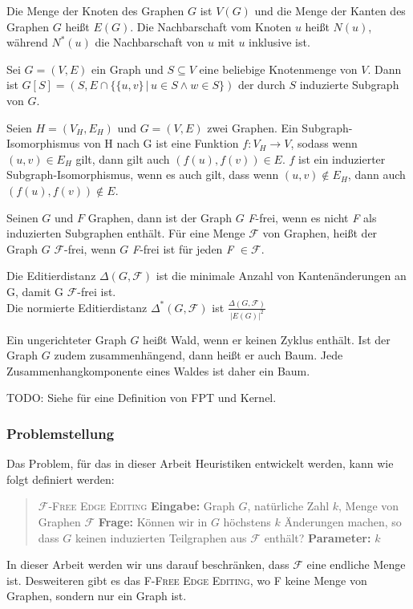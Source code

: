 \documentclass[12pt,a4paper,onecolumn,oneside,titlepage]{article}
\newcommand\cursive[1]{\ensuremath{\mathcal{#1}}}
\begin{document}
Die Menge der Knoten des Graphen $G$ ist $V(G)$ und die Menge der Kanten des Graphen $G$ heißt $E(G)$. Die Nachbarschaft vom Knoten $u$ heißt $N(u)$, während $N^{*}(u)$ die Nachbarschaft von $u$ mit $u$ inklusive ist.

Sei $G = (V,E)$ ein Graph und $S \subseteq V$ eine beliebige Knotenmenge von $V$. 
Dann ist $G[S] = (S, E \cap \{\{u,v\} \,|\, u \in S \land w \in S\})$ der durch $S$ induzierte Subgraph von $G$.

Seien $H = (V_H,E_H)$ und $G =(V,E)$ zwei Graphen. Ein Subgraph-Isomorphismus von H nach G ist eine Funktion $f : V_H \rightarrow V$, sodass wenn $(u,v) \in E_H $ gilt, dann gilt auch $(f(u),f(v)) \in E$. $f$ ist ein induzierter Subgraph-Isomorphismus, wenn es auch gilt, dass wenn $(u,v) \notin E_H$, dann auch $(f(u),f(v)) \notin E$.

Seinen $G$ und $F$ Graphen, dann ist der Graph $G$ \textit{F}-frei, wenn es nicht \textit{F} als induzierten Subgraphen enthält.
Für eine Menge \cursive{F} von Graphen, heißt der Graph $G$ \cursive{F}-frei, wenn $G$ \textit{F}-frei ist für jeden \textit{F} $\in \cursive{F}$.

Die Editierdistanz $\Delta(G, \cursive{F})$ ist die minimale Anzahl von Kantenänderungen an G, damit G \cursive{F}-frei ist.\\ Die normierte Editierdistanz $\Delta^{*}(G, \cursive{F})$ ist $\frac{\Delta(G, \cursive{F})}{|E(G)|^{2}}$

Ein ungerichteter Graph $G$ heißt Wald, wenn er keinen Zyklus enthält. Ist der Graph $G$ zudem zusammenhängend, dann heißt er auch Baum. Jede Zusammenhangkomponente eines Waldes ist daher ein Baum.

TODO: Siehe \cite{Cai96} für eine Definition von FPT und Kernel.
\subsubsection{Problemstellung}
\label{sec:problem}
Das Problem, für das in dieser Arbeit Heuristiken entwickelt werden, kann wie folgt definiert werden:
\begin{quote}
  \textsc{\cursive{F}-Free Edge Editing}\newline
  \textbf{Eingabe:} Graph $G$, natürliche Zahl $k$, Menge von Graphen \cursive{F}\newline
  \textbf{Frage:} Können wir in $G$ höchstens $k$ Änderungen machen, so dass $G$ keinen induzierten Teilgraphen aus \cursive{F} enthält?\newline
  \textbf{Parameter:} $k$
\end{quote}
In dieser Arbeit werden wir uns darauf beschränken, dass \cursive{F} eine endliche Menge ist.
Desweiteren gibt es das \textsc{F-Free Edge Editing}, wo \textsc{F} keine Menge von Graphen, sondern nur ein Graph ist. \\
\end{document}
